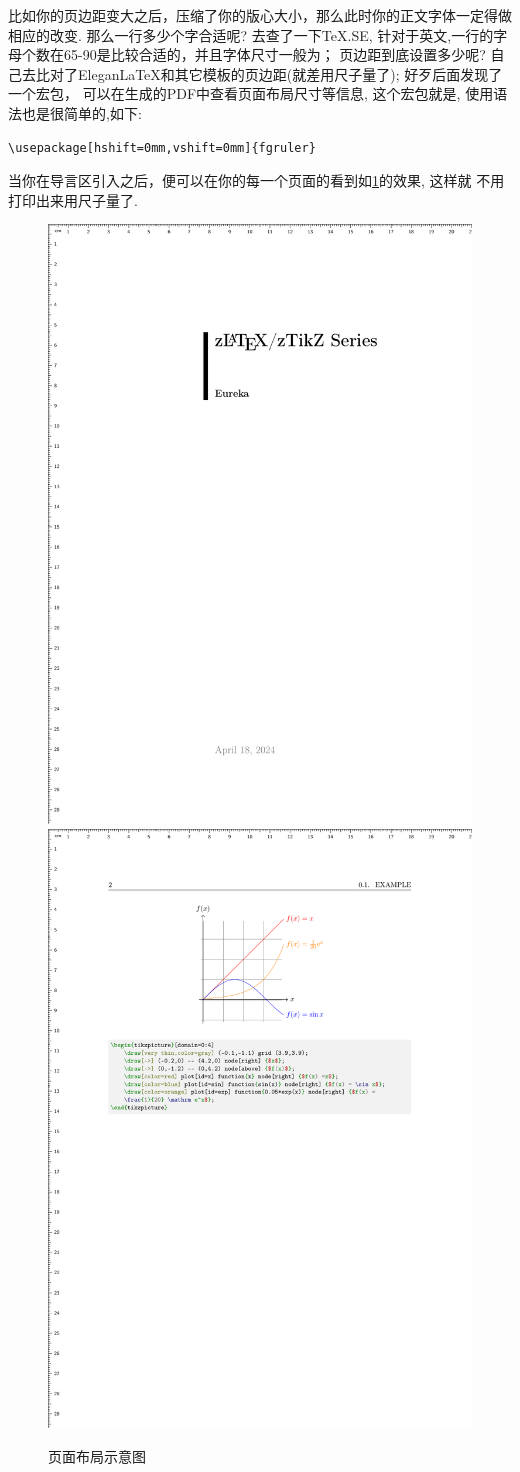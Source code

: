 比如你的页边距变大之后，压缩了你的版心大小，那么此时你的正文字体一定得做相应的改变. 那么一行多少个字合适呢?
去查了一下\TeX.SE, 针对于英文,一行的字母个数在65-90是比较合适的，并且字体尺寸一般为\cmd{10pt,11pt,12pt}；
页边距到底设置多少呢? 自己去比对了Elegan\LaTeX{}和其它模板的页边距(就差用尺子量了); 好歹后面发现了一个宏包，
可以在生成的PDF中查看页面布局尺寸等信息, 这个宏包就是, 使用语法也是很简单的,如下:

\begin{verbatim}
\usepackage[hshift=0mm,vshift=0mm]{fgruler}
\end{verbatim}

当你在导言区引入之后，便可以在你的每一个页面的看到如\cref{fig:fgruler-example}的效果, 这样就 
不用打印出来用尺子量了.

\begin{figure}[!htb]
    \centering
    \includegraphics[width=.45\linewidth]{./pics/fgruler_1.pdf}
    \includegraphics[width=.45\linewidth]{./pics/fgruler_2.pdf}
    \caption{页面布局示意图}
    \label{fig:fgruler-example}
\end{figure}

